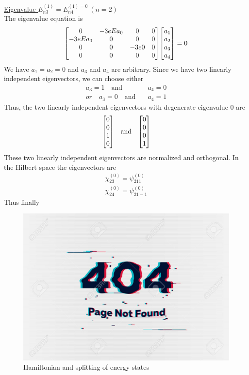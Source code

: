 		
		
		\underline{Eigenvalue $E_{n 3}^{(1)} = E_{n 4}^{(1)= 0} \ (n=2)$}\\
		The eigenvalue equation is
		\begin{equation*}
			\mqty[0 & - 3 e E a_0 & 0 & 0 \\
			-3 e E a_0 & 0 & 0 & 0\\
			0 & 0 & -3 e 0 & 0\\
			0 & 0 & 0 & 0
			]\mqty[a_1 \\ a_2 \\ a_3 \\ a_4] = 0
		\end{equation*}
		We have $ a_1 = a_2 = 0$ and $a_3$ and $a_4$ are arbitrary. Since we have two linearly independent eigenvectors, we can choose either
		\begin{align*}
			a_3 = 1 \quad \text{and} &\quad a_4 = 0 \\
			or\quad 			a_3 = 0 \quad \text{and} &\quad a_4 = 1
		\end{align*}
		Thus, the two linearly independent eigenvectors with degenerate eigenvalue $0$ are
		\begin{equation*}
			\mqty[0 \\ 0 \\ 1 \\ 0] \quad \text{and} \quad \mqty[0 \\ 0 \\ 0 \\ 1]
		\end{equation*}
		These two linearly independent eigenvectors are normalized and orthogonal. In the Hilbert space the eigenvectors are
		\begin{align*}
		\chi_{2 3}^{(0)} = \psi_{2 1 1}^{(0)}			\\
		\chi_{2 4}^{(0)} = \psi_{2 1 -1}^{(0)}
		\end{align*}
		Thus finally
		
		\begin{figure}
			\centering
			\includegraphics[width=0.5\linewidth]{Pictures/not-found.jpg}
			\caption{Hamiltonian and splitting of energy states}
		\end{figure}


	
	


